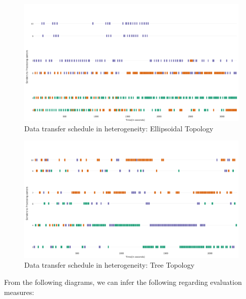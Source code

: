 	\begin{figure}
    \centering
    \includegraphics[width=1.0\textwidth]{gfx/RPlots/DFD_EllipsoidTopology.png}
    \caption{Data transfer schedule in heterogeneity: Ellipsoidal Topology}
    \label{fig:dfd_ellipsoid}
    \end{figure}
        
	\begin{figure}
    \centering
    \includegraphics[width=1.0\textwidth]{gfx/RPlots/DFD_TreeTopology.png}
    \caption{Data transfer schedule in heterogeneity: Tree Topology}
    \label{fig:dfd_tree}
    \end{figure}
    
    From the following diagrams, we can infer the following regarding evaluation measures:
    
